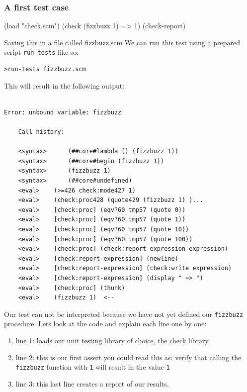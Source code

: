\documentclass[12pt,a4paper,english,twoside]{article}
\begin{document}
\subsubsection{A first test case}
\begin{schemecode}
(load "check.scm")
(check (fizzbuzz 1) => 1)
(check-report)
\end{schemecode}
Saving this in a file called fizzbuzz.scm We can run this test using a 
prepared script \texttt{run-tests} like so:
\begin{lstlisting}
>run-tests fizzbuzz.scm
\end{lstlisting}
This will result in the following output:
\begin{lstlisting}

Error: unbound variable: fizzbuzz

    Call history:

    <syntax>	  (##core#lambda () (fizzbuzz 1))
    <syntax>	  (##core#begin (fizzbuzz 1))
    <syntax>	  (fizzbuzz 1)
    <syntax>	  (##core#undefined)
    <eval>	  (>=426 check:mode427 1)
    <eval>	  (check:proc428 (quote429 (fizzbuzz 1) )...
    <eval>	  [check:proc] (eqv?60 tmp57 (quote 0))
    <eval>	  [check:proc] (eqv?60 tmp57 (quote 1))
    <eval>	  [check:proc] (eqv?60 tmp57 (quote 10))
    <eval>	  [check:proc] (eqv?60 tmp57 (quote 100))
    <eval>	  [check:proc] (check:report-expression expression)
    <eval>	  [check:report-expression] (newline)
    <eval>	  [check:report-expression] (check:write expression)
    <eval>	  [check:report-expression] (display " => ")
    <eval>	  [check:proc] (thunk)
    <eval>	  (fizzbuzz 1)	<--
\end{lstlisting}
Our test can not be interpreted because we have not yet defined our 
\texttt{fizzbuzz} procedure. Lets look at the code and explain each line 
one by one:

\begin{enumerate}
  \item line 1: loads our unit testing library of choice, the check library
  \item line 2: this is our first assert you could read this as: verify that calling 
    the \texttt{fizzbuzz} function with \texttt{1} will result in the value 
    \texttt{1}
 \item line 3: this last line creates a report of our results.
\end{enumerate}
\end{document}
